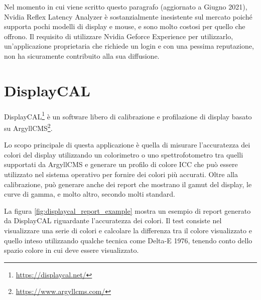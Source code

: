 Nel momento in cui viene scritto questo paragrafo (aggiornato a Giugno 2021), Nvidia Reflex Latency Analyzer è sostanzialmente inesistente sul mercato poiché supporta pochi modelli di display e mouse, e sono molto costosi per quello che offrono. Il requisito di utilizzare Nvidia Geforce Experience per utilizzarlo, un'applicazione proprietaria che richiede un login e con una pessima reputazione, non ha sicuramente contribuito alla sua diffusione.

\section{DisplayCAL}
DisplayCAL\footnote{\href{https://displaycal.net/}{https://displaycal.net/}} è un software libero di calibrazione e profilazione di display basato su ArgyllCMS\footnote{\href{https://www.argyllcms.com/}{https://www.argyllcms.com/}}.

Lo scopo principale di questa applicazione è quella di misurare l'accuratezza dei colori del display utilizzando un colorimetro o uno spettrofotometro tra quelli supportati da ArgyllCMS e generare un profilo di colore ICC che può essere utilizzato nel sistema operativo per fornire dei colori più accurati. Oltre alla calibrazione, può generare anche dei report che mostrano il gamut del display, le curve di gamma, e molto altro, secondo molti standard.

La figura \ref{fig:displaycal_report_example} mostra un esempio di report generato da DisplayCAL riguardante l'accuratezza dei colori. Il test consiste nel visualizzare una serie di colori e calcolare la differenza tra il colore visualizzato e quello inteso utilizzando qualche tecnica come Delta-E 1976, tenendo conto dello spazio colore in cui deve essere visualizzato.

